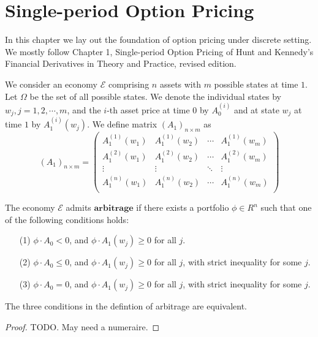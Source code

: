 \chapter{Single-period Option Pricing}

In this chapter we lay out the foundation of option pricing under discrete
setting.
We mostly follow Chapter 1, Single-period Option Pricing of Hunt and Kennedy's
Financial Derivatives in Theory and Practice, revised edition.

We consider an economy $\mathcal{E}$ comprising $n$ assets with $m$ possible
states at time $1$. Let $\Omega$ be the set of all possible states. We denote
the individual states by $w_j,j=1,2,\cdots,m$, and the $i$-th asset price at 
time $0$ by $A_0^{(i)}$ and at state $w_j$ at time $1$ by $A_1^{(i)}(w_j)$.
We define matrix $(A_1)_{n\times m}$ as
\begin{equation}
  (A_1)_{n\times m} = 
    \begin{pmatrix}
      A_1^{(1)}(w_1) & A_1^{(1)}(w_2) & \cdots & A_1^{(1)}(w_m) \\
      A_1^{(2)}(w_1) & A_1^{(2)}(w_2) & \cdots & A_1^{(2)}(w_m) \\
      \vdots         & \vdots         & \ddots & \vdots         \\
      A_1^{(n)}(w_1) & A_1^{(n)}(w_2) & \cdots & A_1^{(n)}(w_m) \\
    \end{pmatrix}
\end{equation}

\begin{definition}
The economy $\mathcal{E}$ admits $\mathbf{arbitrage}$ if there exists a 
portfolio $\phi\in R^n$ such that one of the following conditions holds:
\begin{enumerate}
  \item[(1)] $\phi\cdot A_0<0$, and $\phi\cdot A_1(w_j)\ge 0$ for all $j$.
  \item[(2)] $\phi\cdot A_0\le 0$, and $\phi\cdot A_1(w_j)\ge 0$ for all $j$,
    with strict inequality for some $j$.
  \item[(3)] $\phi\cdot A_0=0$, and $\phi\cdot A_1(w_j)\ge 0$ for all $j$,
    with strict inequality for some $j$.
\end{enumerate}
\end{definition}

\begin{proposition}
The three conditions in the defintion of arbitrage are equivalent.
\end{proposition}
\begin{proof}
TODO. May need a numeraire.
\end{proof}

